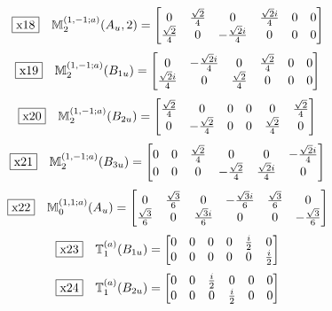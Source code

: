\documentclass[fleqn,10pt,landscape]{jsarticle}
\begin{document}
\begin{dmath*}
\fbox{x18}\quad \mathbb{M}_{2}^{(1,-1;a)}(A_{u},2)=\begin{bmatrix} 0 & \frac{\sqrt{2}}{4} & 0 & \frac{\sqrt{2} i}{4} & 0 & 0 \\ \frac{\sqrt{2}}{4} & 0 & - \frac{\sqrt{2} i}{4} & 0 & 0 & 0 \end{bmatrix}
\end{dmath*}
\begin{dmath*}
\fbox{x19}\quad \mathbb{M}_{2}^{(1,-1;a)}(B_{1u})=\begin{bmatrix} 0 & - \frac{\sqrt{2} i}{4} & 0 & \frac{\sqrt{2}}{4} & 0 & 0 \\ \frac{\sqrt{2} i}{4} & 0 & \frac{\sqrt{2}}{4} & 0 & 0 & 0 \end{bmatrix}
\end{dmath*}
\begin{dmath*}
\fbox{x20}\quad \mathbb{M}_{2}^{(1,-1;a)}(B_{2u})=\begin{bmatrix} \frac{\sqrt{2}}{4} & 0 & 0 & 0 & 0 & \frac{\sqrt{2}}{4} \\ 0 & - \frac{\sqrt{2}}{4} & 0 & 0 & \frac{\sqrt{2}}{4} & 0 \end{bmatrix}
\end{dmath*}
\begin{dmath*}
\fbox{x21}\quad \mathbb{M}_{2}^{(1,-1;a)}(B_{3u})=\begin{bmatrix} 0 & 0 & \frac{\sqrt{2}}{4} & 0 & 0 & - \frac{\sqrt{2} i}{4} \\ 0 & 0 & 0 & - \frac{\sqrt{2}}{4} & \frac{\sqrt{2} i}{4} & 0 \end{bmatrix}
\end{dmath*}
\begin{dmath*}
\fbox{x22}\quad \mathbb{M}_{0}^{(1,1;a)}(A_{u})=\begin{bmatrix} 0 & \frac{\sqrt{3}}{6} & 0 & - \frac{\sqrt{3} i}{6} & \frac{\sqrt{3}}{6} & 0 \\ \frac{\sqrt{3}}{6} & 0 & \frac{\sqrt{3} i}{6} & 0 & 0 & - \frac{\sqrt{3}}{6} \end{bmatrix}
\end{dmath*}
\begin{dmath*}
\fbox{x23}\quad \mathbb{T}_{1}^{(a)}(B_{1u})=\begin{bmatrix} 0 & 0 & 0 & 0 & \frac{i}{2} & 0 \\ 0 & 0 & 0 & 0 & 0 & \frac{i}{2} \end{bmatrix}
\end{dmath*}
\begin{dmath*}
\fbox{x24}\quad \mathbb{T}_{1}^{(a)}(B_{2u})=\begin{bmatrix} 0 & 0 & \frac{i}{2} & 0 & 0 & 0 \\ 0 & 0 & 0 & \frac{i}{2} & 0 & 0 \end{bmatrix}
\end{dmath*}
\end{document}
